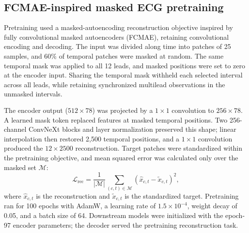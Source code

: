 \subsection{FCMAE-inspired masked ECG pretraining}
\label{sec:pretraining}

Pretraining used a masked-autoencoding reconstruction objective inspired by fully convolutional masked autoencoders (FCMAE), retaining convolutional encoding and decoding\cite{he2022mae,woo2023convnextv2}. The input was divided along time into patches of 25 samples, and 60\% of temporal patches were masked at random. The same temporal mask was applied to all 12 leads, and masked positions were set to zero at the encoder input. Sharing the temporal mask withheld each selected interval across all leads, while retaining synchronized multilead observations in the unmasked intervals.

The encoder output ($512\times78$) was projected by a $1\times1$ convolution to $256\times78$. A learned mask token replaced features at masked temporal positions. Two 256-channel ConvNeXt blocks and layer normalization preserved this shape; linear interpolation then restored 2,500 temporal positions, and a $1\times1$ convolution produced the $12\times2500$ reconstruction. Target patches were standardized within the pretraining objective, and mean squared error was calculated only over the masked set $\mathcal{M}$:
\begin{equation}
\mathcal{L}_{\mathrm{rec}}=
\frac{1}{|\mathcal{M}|}
\sum_{(c,t)\in\mathcal{M}}
\left(\hat{x}_{c,t}-\tilde{x}_{c,t}\right)^2,
\label{eq:pretrain_loss}
\end{equation}
where $\hat{x}_{c,t}$ is the reconstruction and $\tilde{x}_{c,t}$ is the standardized target. Pretraining ran for 100 epochs with AdamW, a learning rate of $1.5\times10^{-4}$, weight decay of 0.05, and a batch size of 64. Downstream models were initialized with the epoch-97 encoder parameters; the decoder served the pretraining reconstruction task.


